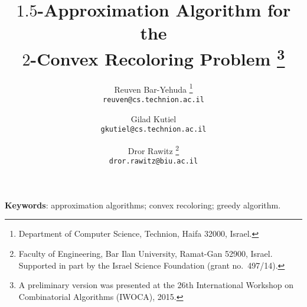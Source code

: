 \title{\bf $1.5$-Approximation Algorithm for the \\ 
$2$-Convex Recoloring Problem%
\thanks{A preliminary version was presented at the 26th
International Workshop on Combinatorial Algorithms (IWOCA), 2015.}
}

\begin{titlepage}

\author{%
Reuven Bar-Yehuda%
\thanks{Department of Computer Science, Technion, Haifa 32000, Israel.}
\\
{\tt\small reuven@cs.technion.ac.il}
\and
Gilad Kutiel\footnotemark[2] \\
{\tt\small gkutiel@cs.technion.ac.il}
\and
Dror Rawitz%
\thanks{Faculty of Engineering, Bar Ilan University, Ramat-Gan 52900,
Israel.  Supported in part by the Israel Science Foundation (grant
no.~497/14).} \\
{\tt\small dror.rawitz@biu.ac.il}
%
}

\maketitle



\medskip

\noindent
\textbf{Keywords}:
approximation algorithms; convex recoloring; greedy algorithm.

\renewcommand{\thepage}{}
\end{titlepage}

